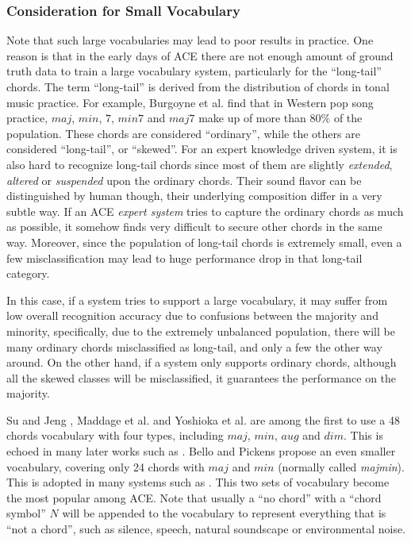\subsubsection{Consideration for Small Vocabulary}
Note that such large vocabularies may lead to poor results in practice. One reason is that in the early days of ACE there are not enough amount of ground truth data to train a large vocabulary system, particularly for the ``long-tail'' chords. The term ``long-tail'' is derived from the distribution of chords in tonal music practice. For example, Burgoyne et al. \cite{burgoyne2011expert} find that in Western pop song practice, $maj$, $min$, $7$, $min7$ and $maj7$ make up of more than $80\%$ of the population. These chords are considered ``ordinary'', while the others are considered ``long-tail'', or ``skewed''. For an expert knowledge driven system, it is also hard to recognize long-tail chords since most of them are slightly {\it extended}, {\it altered} or {\it suspended} upon the ordinary chords. Their sound flavor can be distinguished by human though, their underlying composition differ in a very subtle way. If an ACE {\it expert system} tries to capture the ordinary chords as much as possible, it somehow finds very difficult to secure other chords in the same way. Moreover, since the population of long-tail chords is extremely small, even a few misclassification may lead to huge performance drop in that long-tail category.

In this case, if a system tries to support a large vocabulary, it may suffer from low overall recognition accuracy due to confusions between the majority and minority, specifically, due to the extremely unbalanced population, there will be many ordinary chords misclassified as long-tail, and only a few the other way around. On the other hand, if a system only supports ordinary chords, although all the skewed classes will be misclassified, it guarantees the performance on the majority. \cite{deng2016hybrid}

Su and Jeng \cite{su2001multi}, Maddage et al. \cite{maddage2004content} and Yoshioka et al. \cite{yoshioka2004automatic} are among the first to use a 48 chords vocabulary with four types, including $maj$, $min$, $aug$ and $dim$. This is echoed in many later works such  as \cite{harte2005automatic,catteau2007probabilistic,burgoyne2007cross,su2001multi,papadopoulos2008simultaneous}. Bello and Pickens \cite{bello2005robust} propose an even smaller vocabulary, covering only 24 chords with $maj$ and $min$ (normally called {\it majmin}). This is adopted in many systems such as \cite{ryynanen2008automatic,weil2008hmm,khadkevich2009use,weller2009structured,ni2012end,cho2010exploring,humphrey2012rethinking}. This two sets of vocabulary become the most popular among ACE. Note that usually a ``no chord'' with a ``chord symbol'' $N$ will be appended to the vocabulary to represent everything that is ``not a chord'', such as silence, speech, natural soundscape or environmental noise.

